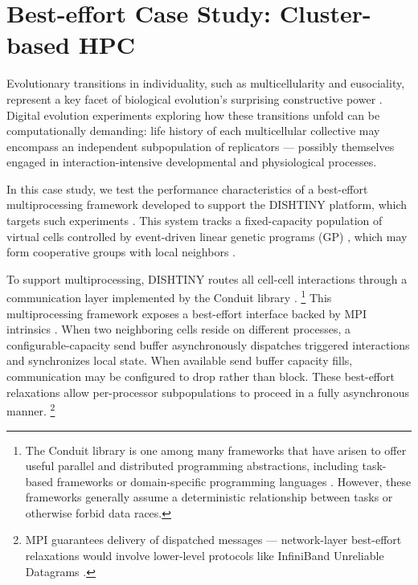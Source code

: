\vspace{-4.0ex}
\section{Best-effort Case Study: Cluster-based HPC} \label{moreno:sec:case1}
\vspace{-2.0ex}



Evolutionary transitions in individuality, such as multicellularity and eusociality, represent a key facet of biological evolution's surprising constructive power \cite{taylor2016open}.
Digital evolution experiments exploring how these transitions unfold can be computationally demanding: life history of each multicellular collective may encompass an independent subpopulation of replicators --- possibly themselves engaged in interaction-intensive developmental and physiological processes.

In this case study, we test the performance characteristics of a best-effort multiprocessing framework developed to support the DISHTINY platform, which targets such experiments \cite{moreno2019toward}.
This system tracks a fixed-capacity population of virtual cells controlled by event-driven linear genetic programs (GP) \cite{lalejini2018evolving}, which may form cooperative groups with local neighbors \cite{moreno2021exploring}.

To support multiprocessing, DISHTINY routes all cell-cell interactions through a communication layer implemented by the Conduit library \cite{moreno2021conduit}.
\unskip\footnote{%
The Conduit library is one among many frameworks that have arisen to offer useful parallel and distributed programming abstractions, including task-based frameworks \cite{kale1993charm++,bauer2012legion,blumofe1996cilk,reinders2007intel} or domain-specific programming languages \cite{el2006upc,chamberlain2007parallel}.
However, these frameworks generally assume a deterministic relationship between tasks or otherwise forbid data races.
}
This multiprocessing framework exposes a best-effort interface backed by MPI intrinsics \cite{gropp1996high}.
When two neighboring cells reside on different processes, a configurable-capacity send buffer asynchronously dispatches triggered interactions and synchronizes local state.
When available send buffer capacity fills, communication may be configured to drop rather than block.
These best-effort relaxations allow per-processor subpopulations to proceed in a fully asynchronous manner.
\unskip\footnote{%
MPI guarantees delivery of dispatched messages --- network-layer best-effort relaxations would involve lower-level protocols like InfiniBand Unreliable Datagrams \cite{kashyap2006ip,koop2007high}.
}


